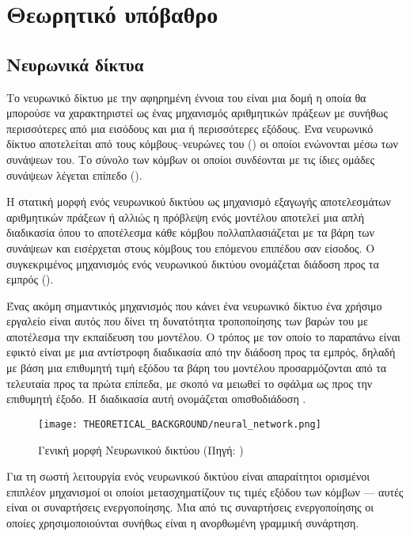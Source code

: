 \chapter{Θεωρητικό υπόβαθρο}
\label{ch:theoreteical_background}

\section{Νευρωνικά δίκτυα}
Το νευρωνικό δίκτυο με την αφηρημένη έννοια του είναι μια δομή η οποία θα μπορούσε να χαρακτηριστεί ως ένας μηχανισμός αριθμητικών πράξεων με συνήθως περισσότερες από μια εισόδους και μια ή περισσότερες εξόδους. Ένα νευρωνικό δίκτυο αποτελείται από τους κόμβους--νευρώνες του () οι οποίοι ενώνονται μέσω των συνάψεων του. Το σύνολο των κόμβων οι οποίοι συνδέονται με τις ίδιες ομάδες συνάψεων λέγεται επίπεδο ().

Η στατική μορφή ενός νευρωνικού δικτύου ως μηχανισμό εξαγωγής αποτελεσμάτων αριθμητικών πράξεων ή αλλιώς η πρόβλεψη ενός μοντέλου αποτελεί μια απλή διαδικασία όπου το αποτέλεσμα κάθε κόμβου πολλαπλασιάζεται με τα βάρη των συνάψεων και εισέρχεται στους κόμβους του επόμενου επιπέδου σαν είσοδος. Ο συγκεκριμένος μηχανισμός ενός νευρωνικού δικτύου ονομάζεται διάδοση προς τα εμπρός ().

Ένας ακόμη σημαντικός μηχανισμός που κάνει ένα νευρωνικό δίκτυο ένα χρήσιμο εργαλείο είναι αυτός που δίνει τη δυνατότητα τροποποίησης των βαρών του με αποτέλεσμα την εκπαίδευση του μοντέλου. Ο τρόπος με τον οποίο το παραπάνω είναι εφικτό είναι με μια αντίστροφη διαδικασία από την διάδοση προς τα εμπρός, δηλαδή με βάση μια επιθυμητή τιμή εξόδου τα βάρη του μοντέλου προσαρμόζονται από τα τελευταία προς τα πρώτα επίπεδα, με σκοπό να μειωθεί το σφάλμα ως προς την επιθυμητή έξοδο. Η διαδικασία αυτή ονομάζεται οπισθοδιάδοση .

\begin{figure}[H]
  \begin{center}
    \texttt{[image: THEORETICAL\_BACKGROUND/neural\_network.png]}
    \caption{Γενική μορφή Νευρωνικού δικτύου (Πηγή: \href{https://mc.ai/my-notes-on-neural-networks-2/}{})}
    \label{fig:neur_net}
  \end{center}
\end{figure}

Για τη σωστή λειτουργία ενός νευρωνικού δικτύου είναι απαραίτητοι ορισμένοι επιπλέον μηχανισμοί οι οποίοι μετασχηματίζουν τις τιμές εξόδου των κόμβων --- αυτές είναι οι συναρτήσεις ενεργοποίησης. Μια από τις συναρτήσεις ενεργοποίησης οι οποίες χρησιμοποιούνται συνήθως είναι η ανορθωμένη γραμμική συνάρτηση. 

